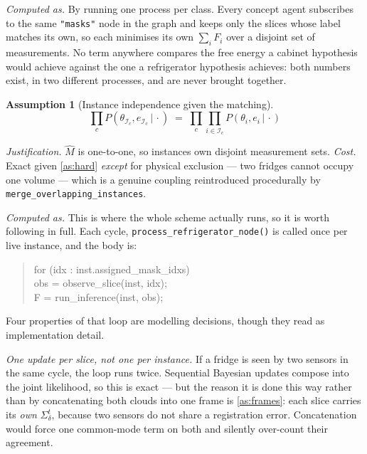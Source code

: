 \documentclass[11pt,a4paper]{report}
\newcommand{\given}{\,|\,}
\theoremstyle{definition}   %
\newtheorem{assumption}{Assumption}
\begin{document}
\smallskip\noindent\textit{Computed as.} By running one process per class. Every concept agent subscribes to the same \texttt{"masks"}
node in the graph and keeps only the slices whose label matches its own, so each minimises its own
$\sum_i F_i$ over a disjoint set of measurements. No term anywhere compares the free energy a
cabinet hypothesis would achieve against the one a refrigerator hypothesis achieves: both numbers
exist, in two different processes, and are never brought together.

\begin{assumption}[Instance independence given the matching]\label{as:inst}
\begin{equation}
\prod_{c}P(\theta_{\mathcal{I}_c},e_{\mathcal{I}_c}\given\cdot)
\;=\;\prod_{c}\prod_{i\in\mathcal{I}_c}P(\theta_i,e_i\given\cdot)
\end{equation}
\end{assumption}
\noindent\textit{Justification.} $\hat M$ is one-to-one, so instances own disjoint measurement
sets. \textit{Cost.} Exact given \ref{as:hard} \emph{except} for physical exclusion — two
fridges cannot occupy one volume — which is a genuine coupling reintroduced procedurally by
\texttt{merge\_overlapping\_instances}.


\smallskip\noindent\textit{Computed as.} This is where the whole scheme actually runs, so it is
worth following in full. Each cycle, \texttt{process\_refrigerator\_node()} is called once per
live instance, and the body is:

\begin{quote}
\ttfamily\small
for (idx : inst.assigned\_mask\_idxs)\\
\hspace*{2em}obs = observe\_slice(inst, idx);\\
\hspace*{2em}F = run\_inference(inst, obs);
\end{quote}

\noindent
Four properties of that loop are modelling decisions, though they read as implementation
detail.

\emph{One update per slice, not one per instance.} If a fridge is seen by two sensors in the same
cycle, the loop runs twice. Sequential Bayesian updates compose into the joint likelihood, so this
is exact --- but the reason it is done this way rather than by concatenating both clouds into one
frame is \ref{as:frames}: each slice carries its \emph{own} $\Sigma_\delta^t$, because two sensors
do not share a registration error. Concatenation would force one common-mode term on both and
silently over-count their agreement.
\end{document}
